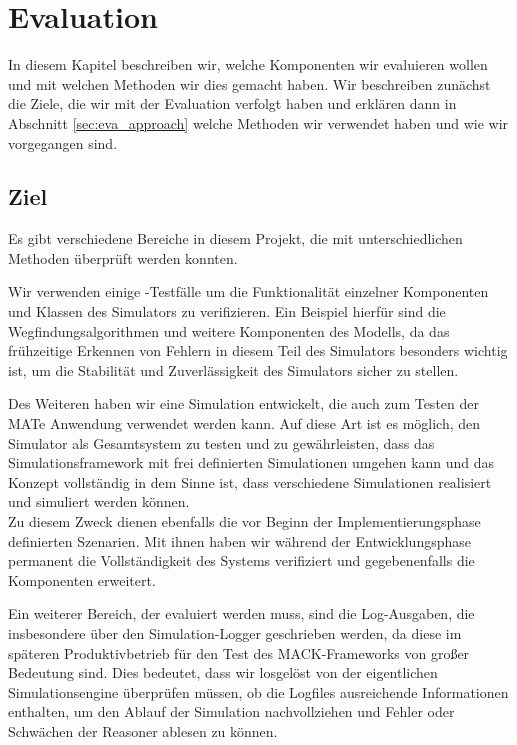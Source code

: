 \chapter{Evaluation}\label{chapter:eval}
In diesem Kapitel beschreiben wir, welche Komponenten wir evaluieren wollen und mit welchen Methoden wir dies gemacht haben. Wir beschreiben zunächst die Ziele, die wir mit der Evaluation verfolgt haben und erklären dann in Abschnitt \ref{sec:eva_approach} welche Methoden wir verwendet haben und wie wir vorgegangen sind.
\section{Ziel}\label{sec:eva_goal}
Es gibt verschiedene Bereiche in diesem Projekt, die mit unterschiedlichen Methoden überprüft werden konnten.

Wir verwenden einige -Testfälle um die Funktionalität einzelner Komponenten und Klassen des Simulators zu verifizieren. Ein Beispiel hierfür sind die Wegfindungsalgorithmen und weitere Komponenten des Modells, da das frühzeitige Erkennen von Fehlern in diesem Teil des Simulators besonders wichtig ist, um die Stabilität und Zuverlässigkeit des Simulators sicher zu stellen.

Des Weiteren haben wir eine Simulation entwickelt, die auch zum Testen der MATe Anwendung verwendet werden kann. Auf diese Art ist es möglich, den Simulator als Gesamtsystem zu testen und zu gewährleisten, dass das Simulationsframework mit frei definierten Simulationen umgehen kann und das Konzept vollständig in dem Sinne ist, dass verschiedene Simulationen realisiert und simuliert werden können.\\
Zu diesem Zweck dienen ebenfalls die vor Beginn der Implementierungsphase definierten Szenarien. Mit ihnen haben wir während der Entwicklungsphase permanent die Vollständigkeit des Systems verifiziert und gegebenenfalls die Komponenten erweitert.

Ein weiterer Bereich, der evaluiert werden muss, sind die Log-Ausgaben, die insbesondere über den Simulation-Logger geschrieben werden, da diese im späteren Produktivbetrieb für den Test des MACK-Frameworks von großer Bedeutung sind. Dies bedeutet, dass wir losgelöst von der eigentlichen Simulationsengine überprüfen müssen, ob die Logfiles ausreichende Informationen enthalten, um den Ablauf der Simulation nachvollziehen und Fehler oder Schwächen der Reasoner ablesen zu können.

